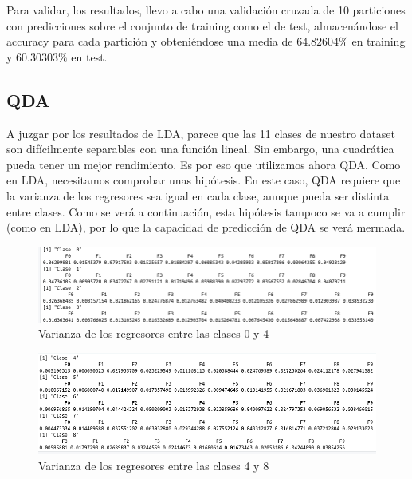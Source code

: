 Para validar, los resultados, llevo a cabo una validación cruzada de 10 particiones con predicciones sobre el conjunto de training como el de test, almacenándose el accuracy para cada partición y obteniéndose una media de $64.82604\%$ en training y  $60.30303\%$ en test.

\subsection{QDA}

A juzgar por los resultados de LDA, parece que las 11 clases de nuestro dataset son difícilmente separables con una función lineal. Sin embargo, una cuadrática pueda tener un mejor rendimiento. Es por eso que utilizamos ahora QDA. Como en LDA, necesitamos comprobar unas hipótesis. En este caso, QDA requiere que la varianza de los regresores sea igual en cada clase, aunque pueda ser distinta entre clases. Como se verá a continuación, esta hipótesis tampoco se va a cumplir (como en LDA), por lo que la capacidad de predicción de QDA se verá mermada.

\begin{figure}[H] %
	\centering
	\includegraphics[scale=0.5]{var1-qda.png}  %
	\caption{Varianza de los regresores entre las clases 0 y 4} 
	\label{fig:var1-qda}
\end{figure}

\begin{figure}[H] %
	\centering
	\includegraphics[scale=0.5]{var2-qda.png}  %
	\caption{Varianza de los regresores entre las clases 4 y 8} 
	\label{fig:var2-qda}
\end{figure}

